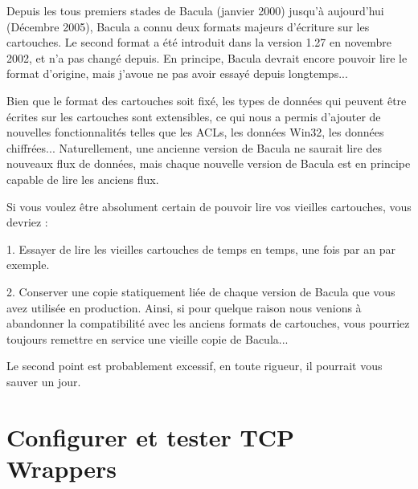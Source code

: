Depuis les tous premiers stades de Bacula (janvier 2000) jusqu'\`a aujourd'hui 
(D\'ecembre 2005), Bacula a connu deux formats majeurs d'\'ecriture sur les 
cartouches. Le second format a \'et\'e introduit dans la version 1.27 en 
novembre 2002, et n'a pas chang\'e depuis. En principe, Bacula devrait encore pouvoir 
lire le format d'origine, mais j'avoue ne pas avoir essay\'e depuis longtemps...

Bien que le format des cartouches soit fix\'e, les types de donn\'ees qui peuvent \^etre 
\'ecrites sur les cartouches sont extensibles, ce qui nous a permis d'ajouter de 
nouvelles fonctionnalit\'es telles que les ACLs, les donn\'ees Win32, les donn\'ees 
chiffr\'ees... Naturellement, une ancienne version de Bacula ne saurait lire des 
nouveaux flux de donn\'ees, mais chaque nouvelle version de Bacula est en principe 
capable de lire les anciens flux.

Si vous voulez \^etre absolument certain de pouvoir lire vos vieilles cartouches, 
vous devriez :

1. Essayer de lire les vieilles cartouches de temps en temps, une fois par an 
par exemple.

2. Conserver une copie statiquement li\'ee de chaque version de Bacula que vous 
avez utilis\'ee en production. Ainsi, si pour quelque raison nous venions \`a 
abandonner la compatibilit\'e avec les anciens formats de cartouches, vous pourriez 
toujours remettre en service une vieille copie de Bacula...

Le second point est probablement excessif, en toute rigueur, il pourrait vous 
sauver un jour.

\label{wrappers}

\section{Configurer et tester TCP Wrappers}

